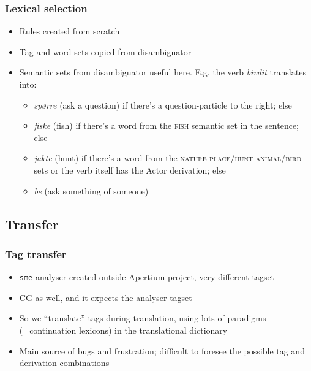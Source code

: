 \documentclass[notes=hide]{beamer}
\newcommand{\sme}{{\tt sme}}
\begin{document}
\begin{frame}\frametitle{Lexical selection}
  \begin{itemize}
  \item Rules created from scratch
  \item Tag and word sets copied from disambiguator
  \item Semantic sets from disambiguator useful here. E.g. the verb
    \textit{bivdit} translates into:
    \begin{itemize}
    \item \textit{spørre} (ask a question) if there's a
      question-particle to the right; else
    \item \textit{fiske} (fish) if there's a word from the \textsc{fish}
      semantic set in the sentence; else
    \item \textit{jakte} (hunt) if there's a word from the
      \textsc{nature-place}/\textsc{hunt-animal}/\textsc{bird} sets or
      the verb itself has the Actor derivation; else
    \item \textit{be} (ask something of someone)
    \end{itemize}
  \end{itemize}
\end{frame}

\subsection{Transfer}
\begin{frame}\frametitle{Tag transfer}
  \begin{itemize}
  \item \sme{} analyser created outside Apertium project, very
    different tagset
  \item CG as well, and it expects the analyser tagset
  \item So we ``translate'' tags during translation, using lots of
    paradigms (=continuation lexicons) in the translational dictionary
  \item Main source of bugs and frustration; difficult to foresee the
    possible tag and derivation combinations
  \end{itemize}
\end{frame}
\end{document}
